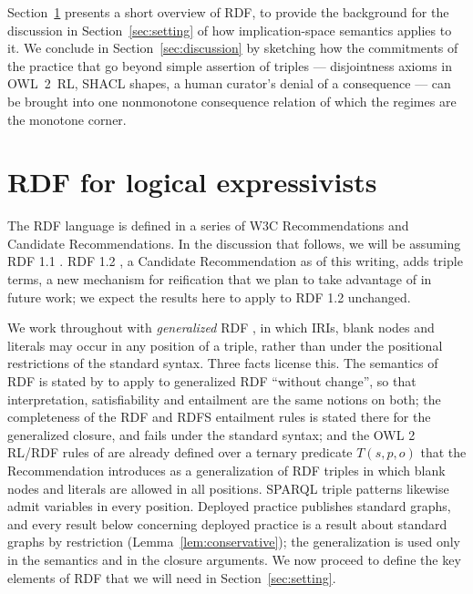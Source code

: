 \documentclass[12pt]{article}
\theoremstyle{definition}
\begin{document}
Section~\ref{sec:nutshell} presents a short overview of RDF, to provide the background for the discussion in Section~\ref{sec:setting} of how implication-space semantics applies to it. We conclude in Section~\ref{sec:discussion} by sketching how the commitments of the practice that go beyond simple assertion of triples --- disjointness axioms in OWL~2~RL, SHACL shapes, a human curator's denial of a consequence --- can be brought into one nonmonotone consequence relation of which the regimes are the monotone corner.

\section{RDF for logical expressivists}
\label{sec:nutshell}

The RDF language is defined in a series of W3C Recommendations and Candidate Recommendations. In the discussion that follows, we will be assuming RDF 1.1 \citep{cyganiak2014rdf,hayes2014rdf}. RDF 1.2 \citep{hartig2026rdf,patelschneider2026rdf}, a Candidate Recommendation as of this writing, adds triple terms, a new mechanism for reification that we plan to take advantage of in future work; we expect the results here to apply to RDF 1.2 unchanged.

We work throughout with \emph{generalized} RDF \citep[\S 7]{cyganiak2014rdf}, in which IRIs, blank nodes and literals may occur in any position of a triple, rather than under the positional restrictions of the standard syntax. Three facts license this. The semantics of RDF is stated by \citet{hayes2014rdf} to apply to generalized RDF ``without change'', so that interpretation, satisfiability and entailment are the same notions on both; the completeness of the RDF and RDFS entailment rules is stated there for the generalized closure, and fails under the standard syntax; and the OWL 2 RL/RDF rules of \citet{motik2012owl} are already defined over a ternary predicate $T(s,p,o)$ that the Recommendation introduces as a generalization of RDF triples in which blank nodes and literals are allowed in all positions. SPARQL triple patterns \citep{harris2013sparql} likewise admit variables in every position. Deployed practice publishes standard graphs, and every result below concerning deployed practice is a result about standard graphs by restriction (Lemma~\ref{lem:conservative}); the generalization is used only in the semantics and in the closure arguments. We now proceed to define the key elements of RDF that we will need in Section~\ref{sec:setting}.
\end{document}
